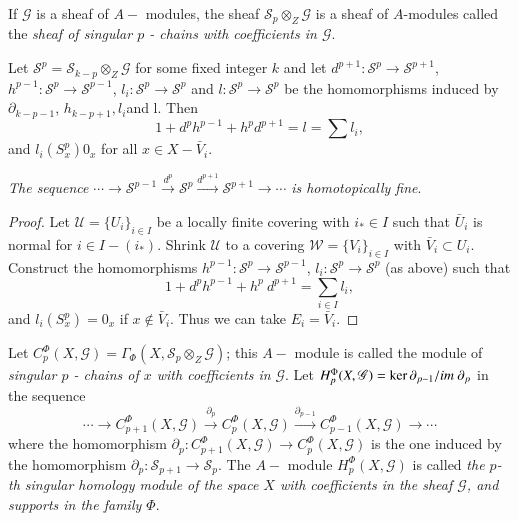 \begin{defi*}%
If $\mathscr{G}$ is a sheaf of $A-$ modules, the sheaf $\mathscr{S}_p
\otimes_Z \mathscr{G}$ is a sheaf of $A$-modules called the {\em{sheaf
    of singular $p$ - chains with coefficients in }} $\mathscr{G}$. 
\end{defi*}

Let $\mathscr{S}^p = \mathscr{S}_{k-p} \otimes_Z \mathscr{G}$ for some
fixed integer $k$ and let $d^{p+1} : \mathscr{S}^p \rightarrow
\mathscr{S}^{p+1}$, $h^{p-1} : \mathscr{S}^p \rightarrow
\mathscr{S}^{p-1}$, $l_i : \mathscr{S}^p \rightarrow \mathscr{S}^p$ and
$l : \mathscr{S}^p \rightarrow \mathscr{S}^p$ be the homomorphisms
induced by $\partial_{k-p-1}$, $h_{k-p+1}, l_i$\pageoriginale and
l. Then  
$$
1 + d^p h^{p-1} + h^p d^{p+1} = l = \sum l_i, 
$$
and $l_i (S^p_x) 0_x$ for all $x \in X - \bar{V}_i$. 

\textit{The sequence} $\cdots \rightarrow \mathscr{S}^{p-1}
\xrightarrow{d^p} \mathscr{S}^p \xrightarrow{d^{p+1}}
\mathscr{S}^{p+1} \rightarrow \cdots$ \textit{is homotopically fine}. 

\begin{proof}
Let $\mathscr{U} = \{U_i \}_{i \in I}$ be a locally finite covering
with $i_* \in I$ such that $\bar{U}_i$ is normal for $i \in I -
(i_*)$. Shrink $\mathscr{U}$ to a covering $\mathscr{W} = \{V_i
\}_{i\in I}$ with $\bar{V}_i \subset U_i$. Construct the homomorphisms
$h^{p-1} : \mathscr{S}^p \rightarrow \mathscr{S}^{p-1}$, 
$l_i :\mathscr{S}^p \rightarrow \mathscr{S}^p$ (as above) such that   
$$
1 + d^p h^{p-1} + h^p ~ d^{p+1} = \sum_{i \in I} l_i,
$$
and $l_i(S^p_x) = 0_x$ if $x \notin \bar{V}_i$. Thus we can take $E_i
= \bar{V}_i$. 
\end{proof}

\begin{defi*}
Let $C^{\Phi}_p (X, \mathscr{G}) = \Gamma_{\Phi} (X,\mathscr{S}_p
\otimes_Z \mathscr{G})$; this $A-$ module is called the module of
       {\em{singular $p$ - chains of $x$ with coefficients in}}
       $\mathscr{G}$. Let $H^{\Phi}_p (X,\break\mathscr{G}) = \ker
       \partial_{p-1}/ im ~ \partial_p$ in the sequence 
$$
\cdots \rightarrow C^{\Phi}_{p+1} (X,\mathscr{G})
\xrightarrow{\partial_p} C^\Phi_{p} (X,\mathscr{G})
\xrightarrow{\partial_{p-1}} C^{\Phi}_{p-1} (X,\mathscr{G})
\rightarrow \cdots 
$$
where the homomorphism $\partial_p : C^{\Phi}_{p+1}(X,\mathscr{G})
\rightarrow C^{\Phi}_{p}(X,\mathscr{G})$ is the one induced by the
homomorphism $\partial_p : \mathscr{S}_{p+1} \rightarrow
\mathscr{S}_p$. The $A-$ module $H^\Phi_p (X,\mathscr{G})$ is called
\textit{the $p$-th singular homology module of the space $X$ with
  coefficients in the sheaf $\mathscr{G}$, and supports in the family
  $\Phi$}. 
\end{defi*}

